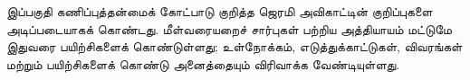 \documentclass[../../include/open-logic-part]{subfiles}
\begin{document}


\begin{editorial}
  இப்பகுதி கணிப்புத்தன்மைக் கோட்பாடு குறித்த ஜெரமி அவிகாட்டின்
  குறிப்புகளை அடிப்படையாகக் கொண்டது. மீள்வரையறைச் சார்புகள் பற்றிய
  அத்தியாயம் மட்டுமே இதுவரை பயிற்சிகளைக் கொண்டுள்ளது; உள்நோக்கம்,
  எடுத்துக்காட்டுகள், விவரங்கள் மற்றும் பயிற்சிகளைக் கொண்டு அனைத்தையும்
  விரிவாக்க வேண்டியுள்ளது.
\end{editorial}



\OLEndPartHook
\end{document}
